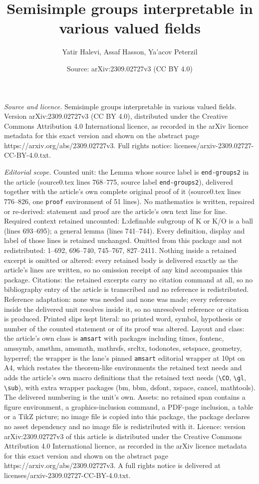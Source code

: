 \documentclass[10pt,a4paper]{amsart}
\title[Semisimple groups interpretable in various valued fields]{Semisimple groups interpretable in various valued fields}
\author{Yatir Halevi, Assaf Hasson, Ya'acov Peterzil}
\date{Source: arXiv:2309.02727v3 (CC BY 4.0)}
\begin{document}
\maketitle

\noindent\emph{Source and licence.} Semisimple groups interpretable in various valued fields. Version arXiv:2309.02727v3 (CC BY 4.0), distributed under the Creative Commons Attribution 4.0 International licence, as recorded in the arXiv licence metadata for this exact version and shown on the abstract page https://arxiv.org/abs/2309.02727v3. Full rights notice: licenses/arxiv-2309.02727-CC-BY-4.0.txt.\par\smallskip

\noindent\textit{Editorial scope.} Counted unit: the Lemma whose source label is \texttt{end-groups2} in the article (source0.tex lines 768--775, source label \texttt{end-groups2}), delivered together with the article's own complete original proof of it (source0.tex lines 776--826, one \texttt{proof} environment of 51 lines). No mathematics is written, repaired or re-derived: statement and proof are the article's own text line for line. Required context retained uncounted: L:definable subgroup of K or K/O is a ball (lines 693--695); a general lemma (lines 741--744). Every definition, display and label of those lines is retained unchanged. Omitted from this package and not redistributed: 1--692, 696--740, 745--767, 827--2411. Nothing inside a retained excerpt is omitted or altered: every retained body is delivered exactly as the article's lines are written, so no omission receipt of any kind accompanies this package. Citations: the retained excerpts carry no citation command at all, so no bibliography entry of the article is transcribed and no reference is redistributed. Reference adaptation: none was needed and none was made; every reference inside the delivered unit resolves inside it, so no unresolved reference or citation is produced. Printed slips kept literal: no printed word, symbol, hypothesis or number of the counted statement or of its proof was altered. Layout and class: the article's own class is \texttt{amsart} with packages including times, fontenc, amssymb, amsthm, amsmath, mathrsfs, srcltx, todonotes, setspace, geometry, hyperref; the wrapper is the lane's pinned \texttt{amsart} editorial wrapper at 10pt on A4, which restates the theorem-like environments the retained text needs and adds the article's own macro definitions that the retained text needs (\texttt{\textbackslash CO}, \texttt{\textbackslash gl}, \texttt{\textbackslash sub}), with extra wrapper packages (bm, bbm, dsfont, xspace, cancel, mathtools). The delivered numbering is the unit's own. Assets: no retained span contains a figure environment, a graphics-inclusion command, a PDF-page inclusion, a table or a TikZ picture; no image file is copied into this package, the package declares no asset dependency and no image file is redistributed with it. Licence: version arXiv:2309.02727v3 of this article is distributed under the Creative Commons Attribution 4.0 International licence, as recorded in the arXiv licence metadata for this exact version and shown on the abstract page https://arxiv.org/abs/2309.02727v3. A full rights notice is delivered at licenses/arxiv-2309.02727-CC-BY-4.0.txt. 
\end{document}
